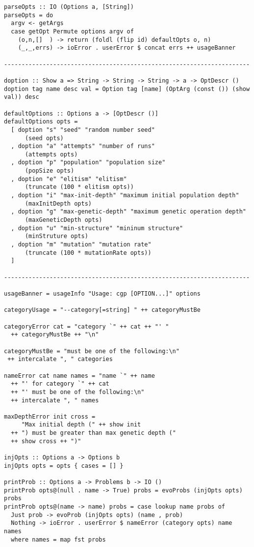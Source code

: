 \documentclass{article}
\newcommand{\n}[1]{\textrm{#1}}
\begin{document}
\begin{lstlisting}
parseOpts :: IO (Options a, [String])
parseOpts = do
  argv <- getArgs
  case getOpt Permute options argv of
    (o,n,[]  ) -> return (foldl (flip id) defaultOpts o, n)
    (_,_,errs) -> ioError . userError $ concat errs ++ usageBanner

----------------------------------------------------------------------

doption :: Show a => String -> String -> String -> a -> OptDescr ()
doption tag name desc val = Option tag [name] (OptArg (const ()) (show val)) desc

defaultOptions :: Options a -> [OptDescr ()]
defaultOptions opts =
  [ doption "s" "seed" "random number seed"
      (seed opts)
  , doption "a" "attempts" "number of runs"
      (attempts opts)
  , doption "p" "population" "population size"
      (popSize opts)
  , doption "e" "elitism" "elitism"
      (truncate (100 * elitism opts))
  , doption "i" "max-init-depth" "maximum initial population depth"
      (maxInitDepth opts)
  , doption "g" "max-genetic-depth" "maximum genetic operation depth"
      (maxGeneticDepth opts)
  , doption "u" "min-structure" "mininum structure"
      (minStruture opts)
  , doption "m" "mutation" "mutation rate"
      (truncate (100 * mutationRate opts))
  ]

----------------------------------------------------------------------

usageBanner = usageInfo "Usage: cgp [OPTION...]" options

categoryUsage = "--category[=string] " ++ categoryMustBe

categoryError cat = "category `" ++ cat ++ "' "
  ++ categoryMustBe ++ "\n"

categoryMustBe = "must be one of the following:\n"
 ++ intercalate ", " categories

nameError cat name names = "name `" ++ name
  ++ "' for category `" ++ cat
  ++ "' must be one of the following:\n"
  ++ intercalate ", " names

maxDepthError init cross =
     "Max initial depth (" ++ show init
  ++ ") must be greater than max genetic depth ("
  ++ show cross ++ ")"

injOpts :: Options a -> Options b
injOpts opts = opts { cases = [] }

printProb :: Options a -> Problems b -> IO ()
printProb opts@(null . name -> True) probs = evoProbs (injOpts opts) probs
printProb opts@(name -> name) probs = case lookup name probs of
  Just prob -> evoProb (injOpts opts) (name , prob)
  Nothing -> ioError . userError $ nameError (category opts) name names
  where names = map fst probs


\end{lstlisting}
\end{document}
